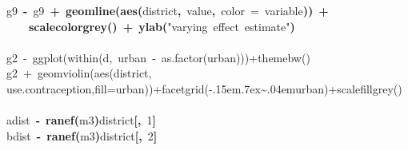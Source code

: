 \documentclass{article}
\makeatletter
\newcommand{\hlnumber}[1]{\textcolor[rgb]{0,0,0}{#1}}%
\newcommand{\hlfunctioncall}[1]{\textcolor[rgb]{.5,0,.33}{\textbf{#1}}}%
\newcommand{\hlstring}[1]{\textcolor[rgb]{.6,.6,1}{#1}}%
\newcommand{\hlkeyword}[1]{\textbf{#1}}%
\newcommand{\hlargument}[1]{\textcolor[rgb]{.69,.25,.02}{#1}}%
\newcommand{\hlcomment}[1]{\textcolor[rgb]{.18,.6,.34}{#1}}%
\newcommand{\hlassignement}[1]{\textbf{#1}}%
\newcommand{\hlsymbol}[1]{#1}%
\def\urltilda{\kern -.15em\lower .7ex\hbox{\~{}}\kern .04em}%
\newcommand{\hlstd}[1]{\textcolor[rgb]{0,0,0}{#1}}%
\newenvironment{kframe}{%
 \def\FrameCommand##1{\hskip\@totalleftmargin \hskip-\fboxsep
 \colorbox{shadecolor}{##1}\hskip-\fboxsep
     \hskip-\linewidth \hskip-\@totalleftmargin \hskip\columnwidth}%
 \MakeFramed {\advance\hsize-\width
   \@totalleftmargin\z@ \linewidth\hsize
   \@setminipage}}%
 {\par\unskip\endMakeFramed}
\newenvironment{knitrout}{}{} %
\makeatother
\begin{document}
\begin{knitrout}
{\begin{kframe}
\begin{flushleft}
\hlstd{}\hlsymbol{g9}{\ }\hlassignement{\usebox{\hlnormalsizeboxlessthan}-}{\ }\hlsymbol{g9}{\ }\hlkeyword{+}{\ }\hlfunctioncall{geom\usebox{\hlnormalsizeboxunderscore}line}\hlkeyword{(}\hlfunctioncall{aes}\hlkeyword{(}\hlsymbol{district}\hlkeyword{,}{\ }\hlsymbol{value}\hlkeyword{,}{\ }\hlargument{color}{\ }\hlargument{=}{\ }\hlsymbol{variable}\hlkeyword{)}\hlkeyword{)}{\ }\hlkeyword{+}\hspace*{\fill}\\
\hlstd{}{\ }{\ }{\ }{\ }\hlfunctioncall{scale\usebox{\hlnormalsizeboxunderscore}color\usebox{\hlnormalsizeboxunderscore}grey}\hlkeyword{(}\hlkeyword{)}{\ }\hlkeyword{+}{\ }\hlfunctioncall{ylab}\hlkeyword{(}\hlstring{"{}varying{\ }effect{\ }estimate"{}}\hlkeyword{)}\hspace*{\fill}\\
\hlstd{}\hspace*{\fill}\\
\hlstd{}\hlcomment{\usebox{\hlnormalsizeboxhash}g2{\ }\usebox{\hlnormalsizeboxlessthan}-{\ }ggplot(within(d,{\ }urban{\ }\usebox{\hlnormalsizeboxlessthan}-{\ }as.factor(urban)))+theme\usebox{\hlnormalsizeboxunderscore}bw()}\hspace*{\fill}\\
\hlstd{}\hlcomment{\usebox{\hlnormalsizeboxhash}g2{\ }+{\ }geom\usebox{\hlnormalsizeboxunderscore}violin(aes(district,}\hspace*{\fill}\\
\hlstd{}\hlcomment{\usebox{\hlnormalsizeboxhash}{\ }{\ }{\ }use.contraception,fill=urban))+facet\usebox{\hlnormalsizeboxunderscore}grid(\urltilda{}urban)+scale\usebox{\hlnormalsizeboxunderscore}fill\usebox{\hlnormalsizeboxunderscore}grey()}\hspace*{\fill}\\
\hlstd{}\hspace*{\fill}\\
\hlstd{}\hlsymbol{a\usebox{\hlnormalsizeboxunderscore}dist}{\ }\hlassignement{\usebox{\hlnormalsizeboxlessthan}-}{\ }\hlfunctioncall{ranef}\hlkeyword{(}\hlsymbol{m3}\hlkeyword{)}\hlkeyword{\usebox{\hlnormalsizeboxdollar}}\hlsymbol{district}\hlkeyword{[}\hlkeyword{,}{\ }\hlnumber{1}\hlkeyword{]}\hspace*{\fill}\\
\hlstd{}\hlsymbol{b\usebox{\hlnormalsizeboxunderscore}dist}{\ }\hlassignement{\usebox{\hlnormalsizeboxlessthan}-}{\ }\hlfunctioncall{ranef}\hlkeyword{(}\hlsymbol{m3}\hlkeyword{)}\hlkeyword{\usebox{\hlnormalsizeboxdollar}}\hlsymbol{district}\hlkeyword{[}\hlkeyword{,}{\ }\hlnumber{2}\hlkeyword{]}\hspace*{\fill}\\

\end{flushleft}
\end{kframe}}
\end{knitrout}
\end{document}
